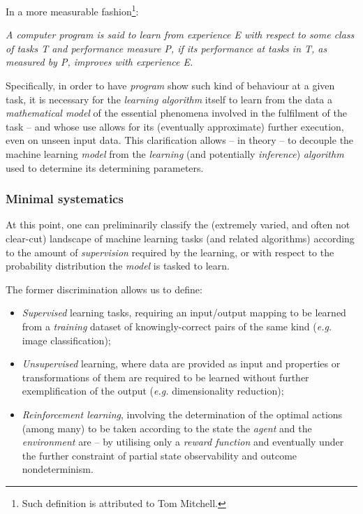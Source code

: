 In a more measurable fashion\footnote{Such definition is attributed to Tom Mitchell.}:

\begin{displayquote}
    \textit{A computer program is said to learn from experience E with respect to some class of tasks T and performance measure P, if its performance at tasks in T, as measured by P, improves with experience E.}
\end{displayquote}

Specifically, in order to have \textit{program} show such kind of behaviour at a given task, it is necessary for the \textit{learning algorithm} itself to learn from the data a \textit{mathematical model} of the essential phenomena involved in the fulfilment of the task -- and whose use allows for its (eventually approximate) further execution, even on unseen input data. This clarification allows -- in theory -- to decouple the machine learning \textit{model} from the \textit{learning} (and potentially \textit{inference}) \textit{algorithm} used to determine its determining parameters.

\subsubsection{Minimal systematics}
At this point, one can preliminarily classify the (extremely varied, and often not clear-cut) landscape of machine learning tasks (and related algorithms) according to the amount of \textit{supervision} required by the learning, or with respect to the probability distribution the \textit{model} is tasked to learn.

The former discrimination allows us to define:
\begin{itemize}
    \item \textit{Supervised} learning tasks, requiring an input/output mapping to be learned from a \textit{training} dataset of knowingly-correct pairs of the same kind (\textit{e.g.} image classification);
    \item \textit{Unsupervised} learning, where data are provided as input and properties or transformations of them are required to be learned without further exemplification of the output (\textit{e.g.} dimensionality reduction);
    \item \textit{Reinforcement learning}, involving the determination of the optimal actions (among many) to be taken according to the state the \textit{agent} and the \textit{environment} are -- by utilising only a \textit{reward function} and eventually under the further constraint of partial state observability and outcome nondeterminism.
\end{itemize}

